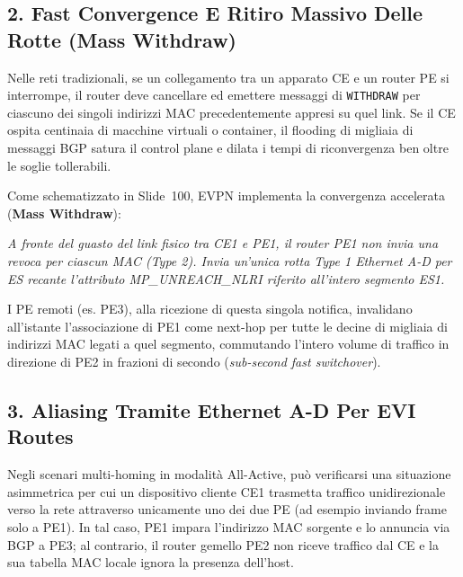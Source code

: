 \documentclass[11pt, a4paper]{article}
\begin{document}
\subsection{2. Fast Convergence E Ritiro Massivo Delle Rotte (Mass Withdraw)}

Nelle reti tradizionali, se un collegamento tra un apparato CE e un router PE si interrompe, il router deve cancellare ed emettere messaggi di \texttt{WITHDRAW} per ciascuno dei singoli indirizzi MAC precedentemente appresi su quel link. Se il CE ospita centinaia di macchine virtuali o container, il flooding di migliaia di messaggi BGP satura il control plane e dilata i tempi di riconvergenza ben oltre le soglie tollerabili.


Come schematizzato in Slide~100, EVPN implementa la convergenza accelerata (\textbf{Mass Withdraw}):
\begin{center}
\emph{A fronte del guasto del link fisico tra CE1 e PE1, il router PE1 non invia una revoca per ciascun MAC (Type 2). Invia un'unica rotta Type 1 Ethernet A-D per ES recante l'attributo MP\_UNREACH\_NLRI riferito all'intero segmento ES1.}
\end{center}
I PE remoti (es. PE3), alla ricezione di questa singola notifica, invalidano all'istante l'associazione di PE1 come next-hop per tutte le decine di migliaia di indirizzi MAC legati a quel segmento, commutando l'intero volume di traffico in direzione di PE2 in frazioni di secondo (\emph{sub-second fast switchover}).

\subsection{3. Aliasing Tramite Ethernet A-D Per EVI Routes}

Negli scenari multi-homing in modalità All-Active, può verificarsi una situazione asimmetrica per cui un dispositivo cliente CE1 trasmetta traffico unidirezionale verso la rete attraverso unicamente uno dei due PE (ad esempio inviando frame solo a PE1). In tal caso, PE1 impara l'indirizzo MAC sorgente e lo annuncia via BGP a PE3; al contrario, il router gemello PE2 non riceve traffico dal CE e la sua tabella MAC locale ignora la presenza dell'host.

\end{document}
